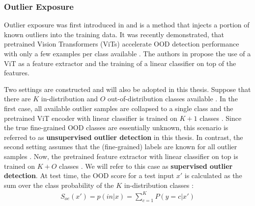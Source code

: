 \subsubsection*{Outlier Exposure}
Outlier exposure was first introduced in \citep{Hendrycks2018} and is a method that injects a portion of known outliers into the training data.
It was recently demonstrated, that pretrained Vision Transformers (ViTs) accelerate OOD detection performance with only a few examples per class available \citep{Fort2021}.
The authors in \citep{Fort2021} propose the use of a ViT as a feature extractor and the training of a linear classifier on top of the features.
\par
Two settings are constructed and will also be adopted in this thesis.
Suppose that there are $K$ in-distribution and $O$ out-of-distribution classes available \citep{Fort2021}.
In the first case, all available outlier samples are collapsed to a single class and the pretrained ViT encoder with linear classifier is trained on $K+1$ classes \citep{Fort2021,Thulasidasan2021}.
Since the true fine-grained OOD classes are essentially unknown, this scenario is referred to as \textbf{unsupervised outlier detection}  in this thesis.
In contrast, the second setting assumes that the (fine-grained) labels are known for all outlier samples \citep{Fort2021,Roy2021}.
Now, the pretrained feature extractor with linear classifier on top is trained on $K+O$ classes \citep{Fort2021}.
We will refer to this case as \textbf{supervised outlier detection}.
At test time, the OOD score for a test input $x'$ is calculated as the sum over the class probability of the $K$ in-distribution classes \citep{Fort2021}:
\begin{align}
	S_{oe}(x') = p(in|x) = \sum_{c=1}^{K}P(y=c|x')
\end{align}
